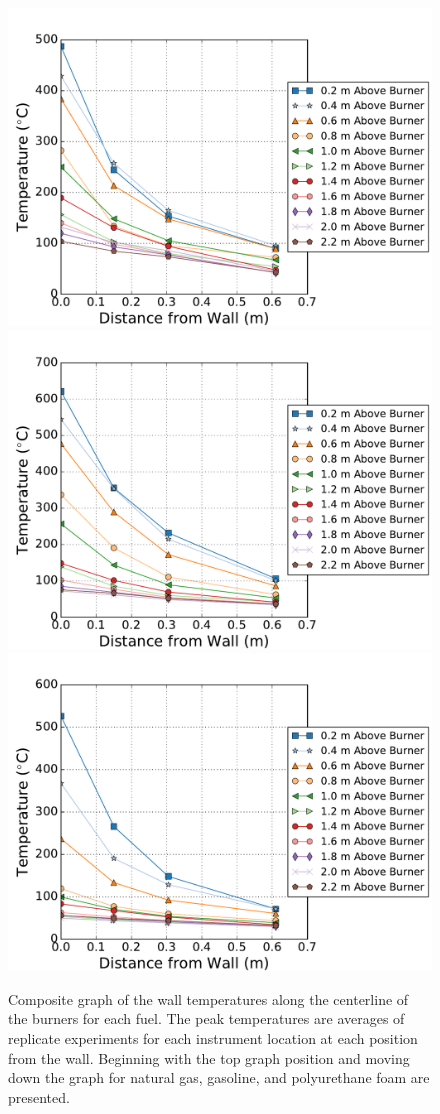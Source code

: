 \documentclass[twoside]{uocthesis}
\begin{document}
{\begin{figure}[p]
	\centering
	\includegraphics[width=.6\columnwidth]{../Figures/NCTW_NG_TC_Surface_Center_Avg}\\
	\includegraphics[width=.6\columnwidth]{../Figures/NCTW_GAS_TC_Surface_Center_Avg}\\
	\includegraphics[width=.6\columnwidth]{../Figures/NCTW_PUF_TC_Surface_Center_Avg}\\
	\caption[Composite graph of the wall temperatures along the centerline of the burners]{Composite graph of the wall temperatures along the centerline of the burners for each fuel. The peak temperatures are averages of replicate experiments for each instrument location at each position from the wall. Beginning with the top graph position and moving down the graph for natural gas, gasoline, and polyurethane foam are presented.}
	\label{NCTW_Surf_Center_comp}
\end{figure}

}
\end{document}
